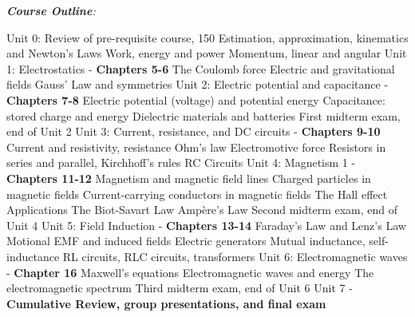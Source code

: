 \documentclass[10pt]{article}
\begin{document}
\textit{\textbf{Course Outline}:}
\begin{outline}[enumerate]
\1 Unit 0: Review of pre-requisite course, 150
\2 Estimation, approximation, kinematics and Newton's Laws
\2 Work, energy and power
\2 Momentum, linear and angular
\1 Unit 1: Electrostatics - \textbf{Chapters 5-6}
\2 The Coulomb force
\2 Electric and gravitational fields
\2 Gauss' Law and symmetries
\1 Unit 2: Electric potential and capacitance - \textbf{Chapters 7-8}
\2 Electric potential (voltage) and potential energy
\2 Capacitance: stored charge and energy
\2 Dielectric materials and batteries
\1 First midterm exam, end of Unit 2
\1 Unit 3: Current, resistance, and DC circuits - \textbf{Chapters 9-10}
\2 Current and resistivity, resistance
\2 Ohm's law
\2 Electromotive force
\2 Resistors in series and parallel, Kirchhoff's rules
\2 RC Circuits
\1 Unit 4: Magnetism 1 - \textbf{Chapters 11-12}
\2 Magnetism and magnetic field lines
\2 Charged particles in magnetic fields
\2 Current-carrying conductors in magnetic fields
\2 The Hall effect
\2 Applications
\2 The Biot-Savart Law
\2 Amp\`{e}re's Law
\1 Second midterm exam, end of Unit 4
\1 Unit 5: Field Induction - \textbf{Chapters 13-14}
\2 Faraday's Law and Lenz's Law
\2 Motional EMF and induced fields
\2 Electric generators
\2 Mutual inductance, self-inductance
\2 RL circuits, RLC circuits, transformers
\1 Unit 6: Electromagnetic waves - \textbf{Chapter 16}
\2 Maxwell's equations
\2 Electromagnetic waves and energy
\2 The electromagnetic spectrum
\1 Third midterm exam, end of Unit 6
\1 Unit 7 - \textbf{Cumulative Review, group presentations, and final exam}
\end{outline}
\end{document}
